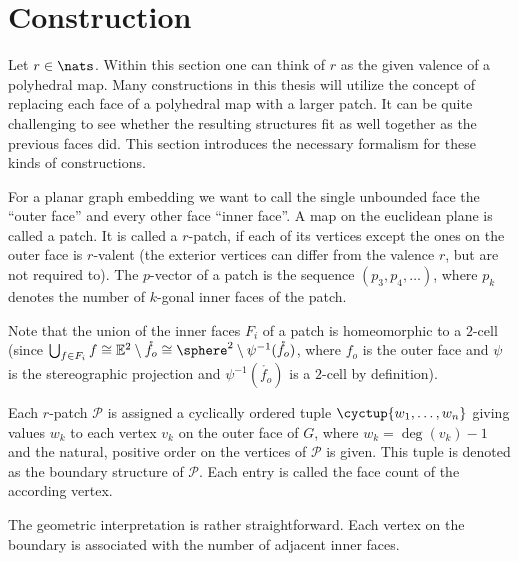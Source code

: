 \section{Construction}

Let $r \in \nats$. Within this section one can think of $r$ as the given valence of a polyhedral map. Many constructions in this thesis will utilize the concept of replacing each face of a polyhedral map with a larger patch. It can be quite challenging to see whether the resulting structures fit as well together as the previous faces did. This section introduces the necessary formalism for these kinds of constructions.

\begin{definition}[Patch] For a planar graph embedding we want to call the single unbounded face the ``outer face'' and every other face ``inner face''. A map on the euclidean plane is called a patch. It is called a $r$-patch, if each of its vertices except the ones on the outer face is $r$-valent (the exterior vertices can differ from the valence $r$, but are not required to). The $p$-vector of a patch is the sequence $(p_3, p_4, \dots)$, where $p_k$ denotes the number of $k$-gonal inner faces of the patch.
\end{definition}

Note that the union of the inner faces $F_{i}$ of a patch is homeomorphic to a $2$-cell (since $\bigcup_{f \in F_{i}} f \cong \mathbb{E}^2 \setminus \mathring{f_{o}} \cong \sphere^2 \setminus \psi^{-1}(\mathring{f_{o}})$, where $f_{o}$ is the outer face and $\psi$ is the stereographic projection and $\psi^{-1}(\mathring{f_{o}})$ is a $2$-cell by definition).

\begin{definition} Each $r$-patch $\mathcal{P}$ is assigned a cyclically ordered tuple $\cyctup{w_1, \dots, w_n}$ giving values $w_k$ to each vertex $v_k$ on the outer face of $G$, where $w_k = \deg(v_k) - 1$ and the natural, positive order on the vertices of $\mathcal{P}$ is given. This tuple is denoted as the boundary structure of $\mathcal{P}$. Each entry is called the face count of the according vertex.
\end{definition}

The geometric interpretation is rather straightforward. Each vertex on the boundary is associated with the number of adjacent inner faces.

